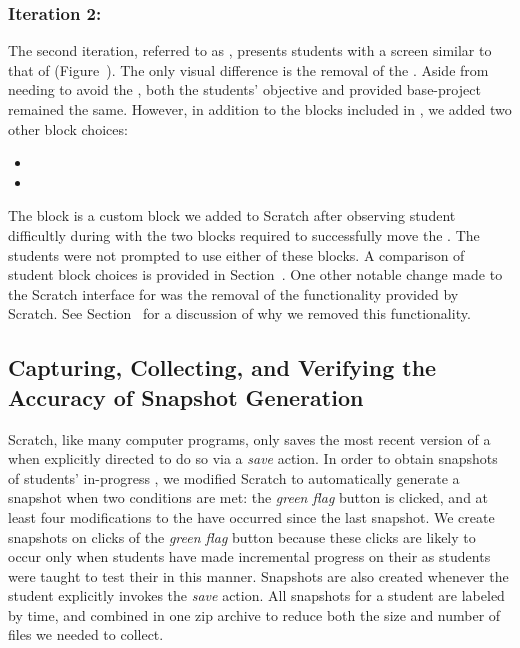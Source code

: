 \subsubsection{Iteration 2: \stwo{}}
The second iteration, referred to as \stwo{}, presents students with a screen
similar to that of \sone{} (Figure~). The only visual
difference is the removal of the \snake{}. Aside from needing to avoid the
\snake{}, both the students' objective and provided base-project remained the
same. However, in addition to the blocks included in \sone{}, we added two
other block choices:

\begin{itemize}
\item \pointtoward{}
\item \glideto{}
\end{itemize}

The \glideto{} block is a custom block we added to Scratch after observing
student difficultly during \sone{} with the two blocks required to successfully
move the \net{}. The students were not prompted to use either of these
blocks. A comparison of student block choices is provided in
Section~. One other notable change made to the Scratch
interface for \stwo{} was the removal of the \dce{} functionality provided by
Scratch. See Section~ for a discussion of why we removed this
functionality.

\subsection{Capturing, Collecting, and Verifying the Accuracy of Snapshot Generation}

Scratch, like many computer programs, only saves the most recent version of a
\sprogram{} when explicitly directed to do so via a \emph{save} action. In
order to obtain snapshots of students' in-progress , we modified
Scratch to automatically generate a snapshot when two conditions are met: the
\emph{green flag} button is clicked, and at least four modifications to the
\sprogram{} have occurred since the last snapshot. We create snapshots on
clicks of the \emph{green flag} button because these clicks are likely to occur
only when students have made incremental progress on their  as
students were taught to test their  in this manner. Snapshots are
also created whenever the student explicitly invokes the \emph{save}
action. All snapshots for a student are labeled by time, and combined in one
zip archive to reduce both the size and number of files we needed to collect.

